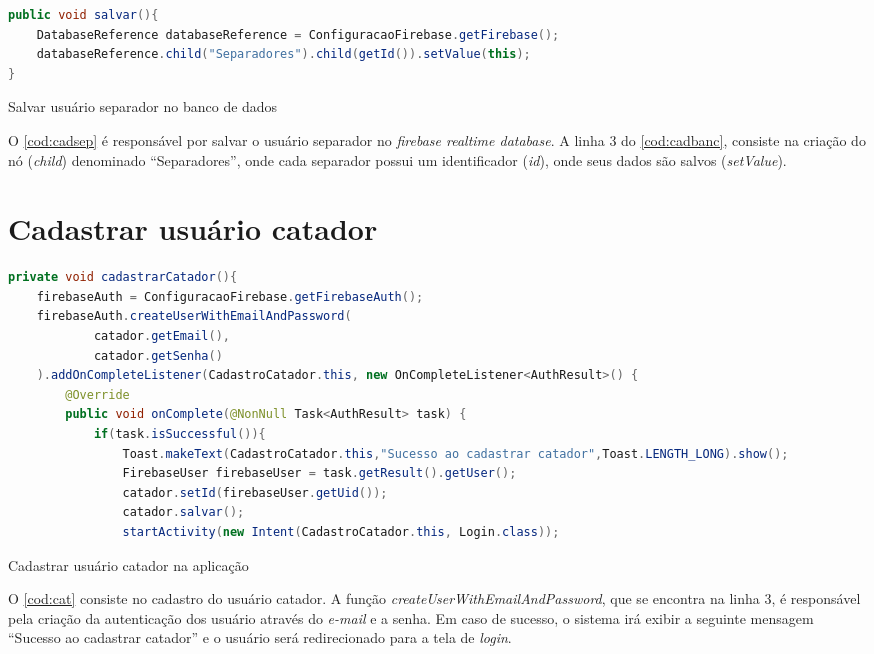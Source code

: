 \begin{codigo}[H]
	\begin{lstlisting}[language=Java]
public void salvar(){
    DatabaseReference databaseReference = ConfiguracaoFirebase.getFirebase();
    databaseReference.child("Separadores").child(getId()).setValue(this);
}
   	\end{lstlisting}
   	\caption{Salvar usuário separador no banco de dados}
   	\label{cod:cadsep}
\end{codigo}

O \autoref{cod:cadsep} é responsável por salvar o usuário separador no \textit{firebase realtime database}. A linha 3 do \autoref{cod:cadbanc}, consiste na criação do nó (\textit{child}) denominado “Separadores”, onde cada separador possui um identificador (\textit{id}), onde seus dados são salvos (\textit{setValue}).


\section{Cadastrar usuário catador}

\begin{codigo}[H]
	\begin{lstlisting}[language=Java]
private void cadastrarCatador(){
    firebaseAuth = ConfiguracaoFirebase.getFirebaseAuth();
    firebaseAuth.createUserWithEmailAndPassword(
            catador.getEmail(),
            catador.getSenha()
    ).addOnCompleteListener(CadastroCatador.this, new OnCompleteListener<AuthResult>() {
        @Override
        public void onComplete(@NonNull Task<AuthResult> task) {
            if(task.isSuccessful()){
                Toast.makeText(CadastroCatador.this,"Sucesso ao cadastrar catador",Toast.LENGTH_LONG).show();
                FirebaseUser firebaseUser = task.getResult().getUser();
                catador.setId(firebaseUser.getUid());
                catador.salvar();
                startActivity(new Intent(CadastroCatador.this, Login.class));
       	\end{lstlisting}
       	\caption{Cadastrar usuário catador na aplicação}
       	\label{cod:cat}
\end{codigo}

O \autoref{cod:cat} consiste no cadastro do usuário catador. A função \textit{createUserWithEmailAndPassword}, que se encontra na linha 3, é responsável pela criação da autenticação dos usuário através do \textit{e-mail} e a senha. Em caso de sucesso, o sistema irá exibir a seguinte mensagem “Sucesso ao cadastrar catador” e o usuário será redirecionado para a tela de \textit{login}.

